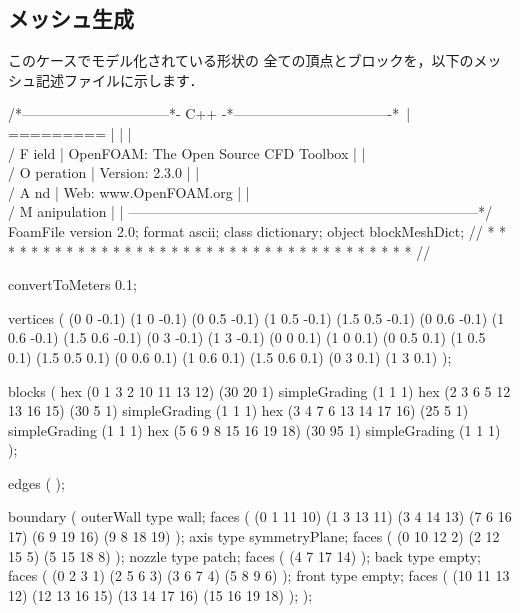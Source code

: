 \subsection{メッシュ生成}
\label{ssec:3.4.2}
このケースでモデル化されている形状の
全ての頂点とブロックを，以下のメッシュ記述ファイルに示します．
\begin{OFverbatim}
/*--------------------------------*- C++ -*----------------------------------*\
| =========                 |                                                 |
| \\      /  F ield         | OpenFOAM: The Open Source CFD Toolbox           |
|  \\    /   O peration     | Version:  2.3.0                                 |
|   \\  /    A nd           | Web:      www.OpenFOAM.org                      |
|    \\/     M anipulation  |                                                 |
\*---------------------------------------------------------------------------*/
FoamFile
{
    version     2.0;
    format      ascii;
    class       dictionary;
    object      blockMeshDict;
}
// * * * * * * * * * * * * * * * * * * * * * * * * * * * * * * * * * * * * * //

convertToMeters 0.1;

vertices        
(
    (0 0 -0.1)
    (1 0 -0.1)
    (0 0.5 -0.1)
    (1 0.5 -0.1)
    (1.5 0.5 -0.1)
    (0 0.6 -0.1)
    (1 0.6 -0.1)
    (1.5 0.6 -0.1)
    (0 3 -0.1)
    (1 3 -0.1)
    (0 0 0.1)
    (1 0 0.1)
    (0 0.5 0.1)
    (1 0.5 0.1)
    (1.5 0.5 0.1)
    (0 0.6 0.1)
    (1 0.6 0.1)
    (1.5 0.6 0.1)
    (0 3 0.1)
    (1 3 0.1)
);

blocks          
(
    hex (0 1 3 2 10 11 13 12) (30 20 1) simpleGrading (1 1 1)
    hex (2 3 6 5 12 13 16 15) (30 5 1) simpleGrading (1 1 1)
    hex (3 4 7 6 13 14 17 16) (25 5 1) simpleGrading (1 1 1)
    hex (5 6 9 8 15 16 19 18) (30 95 1) simpleGrading (1 1 1)
);

edges           
(
);

boundary
(
    outerWall
    {
        type wall;
        faces
        (
            (0 1 11 10)
            (1 3 13 11)
            (3 4 14 13)
            (7 6 16 17)
            (6 9 19 16)
            (9 8 18 19)
        );
    }
    axis
    {
        type symmetryPlane;
        faces
        (
            (0 10 12 2)
            (2 12 15 5)
            (5 15 18 8)
        );
    }
    nozzle
    {
        type patch;
        faces
        (
            (4 7 17 14)
        );
    }
    back
    {
        type empty;
        faces
        (
            (0 2 3 1)
            (2 5 6 3)
            (3 6 7 4)
            (5 8 9 6)
        );
    }
    front
    {
        type empty;
        faces
        (
            (10 11 13 12)
            (12 13 16 15)
            (13 14 17 16)
            (15 16 19 18)
        );
    }
);


\end{OFverbatim}
